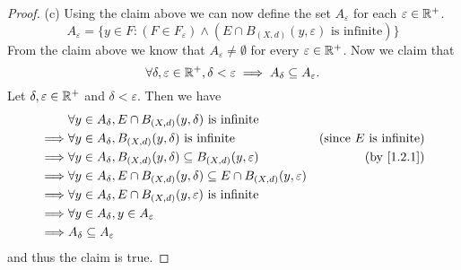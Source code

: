 \begin{proof}{(c)}
  Using the claim above we can now define the set \(A_\varepsilon\) for each \(\varepsilon \in \mathbb{R}^+\).
  \[
    A_\varepsilon = \big\{y \in F : (F \in F_\varepsilon) \land (E \cap B_{(X, d)}(y, \varepsilon) \text{ is infinite})\big\}
  \]
  From the claim above we know that \(A_\varepsilon \neq \emptyset\) for every \(\varepsilon \in \mathbb{R}^+\).
  Now we claim that
  \[
    \forall \delta, \varepsilon \in \mathbb{R}^+, \delta < \varepsilon \implies A_\delta \subseteq A_\varepsilon.
  \]
  Let \(\delta, \varepsilon \in \mathbb{R}^+\) and \(\delta < \varepsilon\).
  Then we have
  \begin{align*}
             & \forall y \in A_\delta, E \cap B_{(X, d)}(y, \delta) \text{ is infinite}                                                            \\
    \implies & \forall y \in A_\delta, B_{(X, d)}(y, \delta) \text{ is infinite}                                & \text{(since \(E\) is infinite)} \\
    \implies & \forall y \in A_\delta, B_{(X, d)}(y, \delta) \subseteq B_{(X, d)}(y, \varepsilon)               & \text{(by \cref{1.2.1})}         \\
    \implies & \forall y \in A_\delta, E \cap B_{(X, d)}(y, \delta) \subseteq E \cap B_{(X, d)}(y, \varepsilon)                                    \\
    \implies & \forall y \in A_\delta, E \cap B_{(X, d)}(y, \varepsilon) \text{ is infinite}                                                       \\
    \implies & \forall y \in A_\delta, y \in A_\varepsilon                                                                                         \\
    \implies & A_\delta \subseteq A_\varepsilon
  \end{align*}
  and thus the claim is true.


\end{proof}
